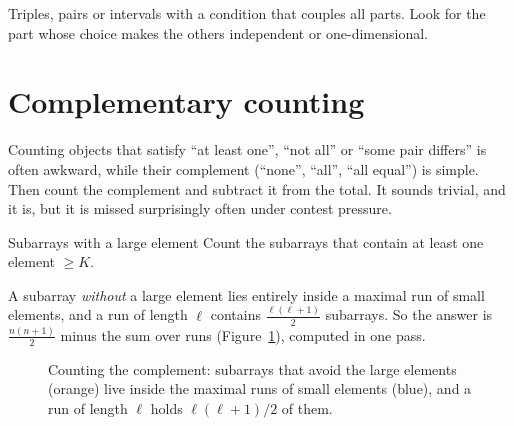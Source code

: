 \begin{recognize}
Triples, pairs or intervals with a condition that couples all parts. Look for the part whose choice makes the others
independent or one-dimensional.
\end{recognize}

\section[Complementary counting]{Complementary counting \hfill \silver}\label{sec:complement}

Counting objects that satisfy ``at least one'', ``not all'' or ``some pair differs'' is often awkward, while their complement
(``none'', ``all'', ``all equal'') is simple. Then count the complement and subtract it from the total. It sounds trivial,
and it is, but it is missed surprisingly often under contest pressure.

\begin{problem}{Subarrays with a large element}
Count the subarrays that contain at least one element $\ge K$.
\end{problem}

A subarray \emph{without} a large element lies entirely inside a maximal run of small elements, and a run of length $\ell$
contains $\frac{\ell(\ell+1)}{2}$ subarrays. So the answer is $\frac{n(n+1)}{2}$ minus the sum over runs
(Figure~\ref{fig:complement}), computed in one pass.

\begin{figure}[htbp]
\centering
{}
\caption{Counting the complement: subarrays that avoid the large elements (orange) live inside the maximal runs of small
elements (blue), and a run of length $\ell$ holds $\ell(\ell+1)/2$ of them.}
\label{fig:complement}
\end{figure}

